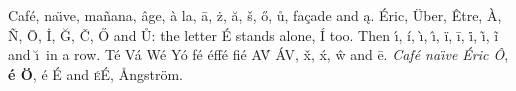 \documentclass{article}
\begin{document}
Caf\'e, na\"{\i}ve, ma\~nana, \^{a}ge, \`a la, \=a, \.z, \u{a}, \v{s}, \H{o}, \r{u}, fa\c{c}ade and \k{a}.
\'Eric, \"Uber, \^Etre, \`A, \~N, \=O, \.I, \u{G}, \v{C}, \H{O} and \r{U}: the letter \'E stands
alone, \'I too. Then \'{\i}, \'i, \`{\i}, \^\i, \"i, \=i, \.i, \~{\i}, \~i and \u\i\ in a row.
T\'e V\'a W\'e Y\'o f\'e \'eff\'e fi\'e A\'V \'AV, \v{x}, \'x, \^{w} and \=e.
\textit{Caf\'e na\"{\i}ve \'Eric \^O}, \textbf{\'e \"O}, {\large \'e \'E} and \textsc{\'e\'E}, Ångström.
\end{document}
